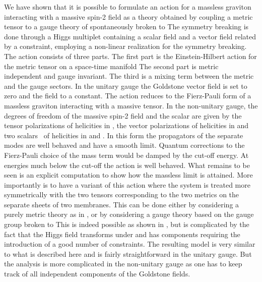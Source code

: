 \documentclass[a4paper,12pt]{article}
\begin{document}
We have shown that it is possible to formulate an action for a massless
graviton interacting with a massive spin-2 field as a theory obtained by
coupling a metric tensor to a gauge theory of \coordHE{} spontaneously broken to
\coordHE{} The symmetry breaking is done through a Higgs multiplet containing
a scalar field and a vector field related by a constraint, employing a
non-linear realization for the symmetry breaking. The action consists of three
parts. The first part is the Einstein-Hilbert action for the metric tensor
\coordHE{} on a space-time manifold \coordHE{} The second part is metric
independent and \coordHE{} gauge invariant. The third is a mixing term between
the metric and the gauge sectors. In the unitary gauge the Goldstone vector
field \coordHE{} is set to zero and the field \myHighlight{$\varphi$}\coordHE{} to a constant. The action
reduces to the Fierz-Pauli form of a massless graviton interacting with a
massive tensor. In the non-unitary gauge, the degrees of freedom of the
massive spin-2 field and the scalar are given by the tensor polarizations of
helicities \coordHE{} in \coordHE{}, the vector polarizations of helicities
\coordHE{} in \coordHE{} and two scalars \ of helicities \coordHE{} in \myHighlight{$\varphi$}\coordHE{} and \coordHE{}. In this form the propagators of the separate modes are well behaved and
have a smooth \coordHE{} limit. Quantum corrections to the Fierz-Pauli
choice of the mass term would be damped by the cut-off energy. At energies
much below the cut-off the action is well behaved. What remains to be seen is
an explicit computation to show how the massless limit is attained. More
importantly is to have a variant of this action where the system is treated
more symmetrically with the two tensors corresponding to the two metrics on
the separate sheets of two membranes. This can be done either by considering a
purely metric theory as in \cite{ags}, or by considering a gauge theory based
on the gauge group \coordHE{} broken to \coordHE{} This is indeed
possible as shown in \cite{css}, but is complicated by the fact that the Higgs
field transforms under \coordHE{} and has \coordHE{} components requiring
the introduction of a good number of constraints. The resulting model is very
similar to what is described here and is fairly straightforward in the unitary
gauge. But the analysis is more complicated in the non-unitary gauge as one
has to keep track of all independent components of the Goldstone fields.
\end{document}
